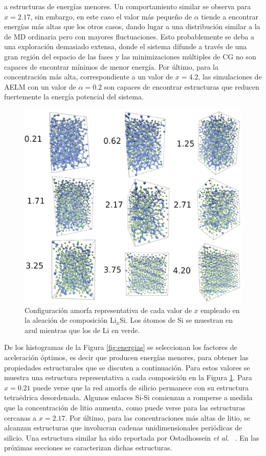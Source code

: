 a estructuras de energías menores. Un comportamiento similar se observa para 
$x = 2.17$, sin embargo, en este caso el valor más pequeño de $\alpha$ tiende a 
encontrar energías más altas que los otros casos, dando lugar a una distribución
similar a la de MD ordinaria pero con mayores fluctuaciones. Esto probablemente 
se deba a una exploración demasiado extensa, donde el sistema difunde a través
de una gran región del espacio de las fases y las minimizaciones múltiples de 
CG no son capaces de encontrar mínimos de menor energía. Por último, para la 
concentración más alta, correspondiente a un valor de $x = 4.2$, las simulaciones 
de AELM con un valor de $\alpha = 0.2$ son capaces de encontrar estructuras que 
reducen fuertemente la energía potencial del sistema. 

\begin{figure}[t]
    \centering
    \includegraphics[width=\textwidth]{Silicio/caracterizacion/resultados/introduccion/amorfas.png}
    \caption{Configuración amorfa representativa de cada valor de $x$ empleado en la aleación de composición Li$_x$Si. Los átomos
    de Si se muestran en azul mientras que los de Li en verde.}
    \label{fig:amorfas}
\end{figure}
De los histogramas de la Figura \ref{fig:energias} se seleccionan los factores 
de aceleración óptimos, es decir que producen energías menores, para obtener
las propiedades estructurales que se discuten a continuación. Para estos valores
se muestra una estructura representativa a cada composición en la Figura 
\ref{fig:amorfas}. Para $x = 0.21$ puede verse que la red amorfa de silicio
permanece con su estructura tetraédrica desordenada. Algunos enlaces Si-Si 
comienzan a romperse a medida que la concentración de litio aumenta, como puede
verse para las estructuras cercanas a $x = 2.17$. Por último, para las 
concentraciones más altas de litio, se alcanzan estructuras que involucran 
cadenas unidimensionales periódicas de silicio. Una estructura similar ha sido 
reportada por Ostadhossein \textit{et al.} ~\cite{ostadhossein2015}. En las 
próximas secciones se caracterizan dichas estructuras.
